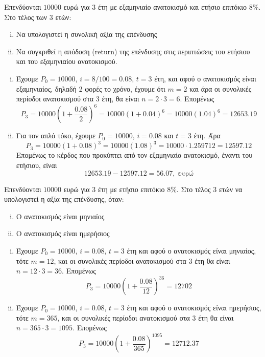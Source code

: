 \documentclass[a4paper,table]{report}
\begin{document}
\begin{example}
  Επενδύονται $ 10000 $ ευρώ για 3 έτη με εξαμηνιαίο ανατοκισμό και ετήσιο επιτόκιο 
  $ 8\% $. Στο τέλος των 3 ετών:
  \begin{enumerate}[i)]
    \item Να υπολογιστεί η συνολική αξία της επένδυσης
    \item Να συγκριθεί η απόδοση (return) της επένδυσης στις περιπτώσεις του ετήσιου και
      του εξαμηνιαίου ανατοκισμού.
  \end{enumerate}
\end{example}
\begin{solution}
\item {}
  \begin{enumerate}[i)]
    \item Έχουμε $ P_{0} = 10000 $, $ i = {8}/{100} = 0.08 $, $ t=3 $ έτη, 
      και αφού ο ανατοκισμός είναι εξαμηνιαίος, δηλαδή 2 φορές το χρόνο, έχουμε ότι 
      $m=2 $ και άρα οι συνολικές περίοδοι ανατοκισμού στα 3 έτη, θα είναι $n=2\cdot 3 =
      6$. Επομένως
      \[
        P_{3} = 10000\left(1+ \frac{0.08}{2} \right)^{6} = 
        10000(1+0.04)^{6} = 10000 (1.04)^{6} = 12653.19
      \] 
    \item Για τον απλό τόκο, έχουμε $ P_{0}=10000 $, $ i=0.08 $ και $ t=3 $ έτη. Άρα
      \[
        P_{3} = 10000(1+0.08)^{3} = 10000(1.08)^{3} = 10000\cdot 1.259712 = 12597.12 
      \] 
      Επομένως το κέρδος που προκύπτει από τον εξαμηνιαίο ανατοκισμό, έναντι του 
      ετήσιου, είναι
      \[
        12653.19-12597.12 = 56.07, \; \text{ευρώ}
      \] 
  \end{enumerate}
\end{solution}

\begin{example}
  Επενδύονται $10000$ ευρώ για 3 έτη με ετήσιο επιτόκιο $ 8\% $. Στο τέλος 3 ετών 
  να υπολογιστεί η αξία της επένδυσης, όταν:
  \begin{enumerate}[i)]
    \item Ο ανατοκισμός είναι μηνιαίος
    \item Ο ανατοκισμός είναι ημερήσιος
  \end{enumerate}
\end{example}
\begin{solution}
\item {}
  \begin{enumerate}[i)]
    \item Έχουμε $ P_{0} = 10000 $, $ i=0.08 $, $ t=3 $ έτη και αφού ο ανατοκισμός 
      είναι μηνιαίος, τότε $ m=12 $, και οι συνολικές περίοδοι ανατοκισμού στα 3 έτη 
      θα είναι $ n=12\cdot 3 = 36 $. Επομένως
      \[
        P_{3} = 10000\left(1+ \frac{0.08}{12} \right)^{36} = 12702 
      \] 
    \item Έχουμε $ P_{0} = 10000 $, $ i=0.08 $, $ t=3 $ έτη και αφού ο ανατοκισμός 
      είναι ημερήσιος, τότε $ m=365 $, και οι συνολικές περίοδοι ανατοκισμού στα 3 έτη 
      θα είναι $ n=365\cdot 3 = 1095 $. Επομένως
      \[
        P_{3} = 10000\left(1+ \frac{0.08}{365} \right)^{1095} = 12712.37 
      \] 
  \end{enumerate}
\end{solution}
\end{document}

